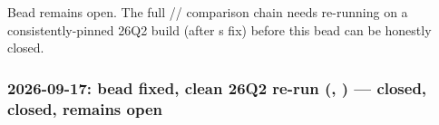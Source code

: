 \begin{record}
Bead  remains open. The full //
comparison chain needs re-running on a consistently-pinned 26Q2 build
(after \textquotesingle s fix) before this bead can be
honestly closed.

\end{record}

\subsubsection{\texorpdfstring{2026-09-17: bead  fixed, clean
26Q2 re-run (, ) ---
 closed,  closed,  remains
open}{2026-09-17: bead  fixed, clean 26Q2 re-run (, ) ---  closed,  closed,  remains open}}\label{cr:run:phase5:2026-09-17-bead-djm-fixed-clean-26q2-re-run-soc-ydw2-run-2026-09-17-09-01-42-ydw-closed-0ah-closed-rvb-remains-open}


